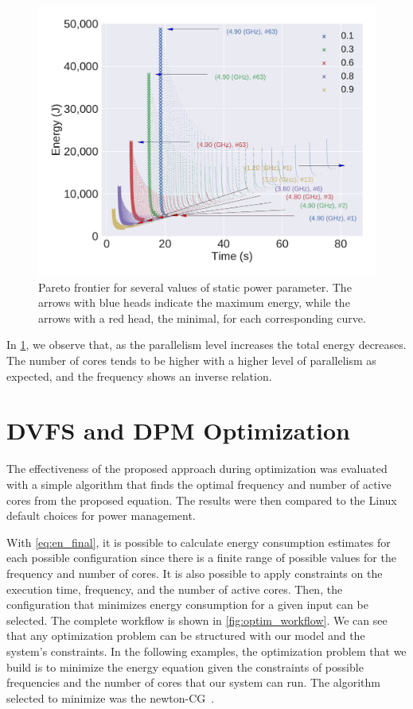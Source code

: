 \begin{figure}[H]
	\includegraphics[width=\columnwidth]{models/figures/analisys/pareto_w_high.pdf}
	\caption{Pareto frontier for several values of static power parameter. The arrows with blue heads indicate the maximum energy, while the arrows with a red head, the minimal, for each corresponding curve.}%
	\label{fig:pareto_w}
\end{figure}

In  \cref{fig:pareto_w}, we observe that, as the parallelism level increases the total energy decreases. The number of cores tends to be higher with a higher level of parallelism as expected, and the frequency shows an inverse relation.


\section{DVFS and DPM Optimization} \label{sec:dvfs_dpm_optminzation}
The effectiveness of the proposed approach during optimization was evaluated with a simple algorithm that finds the optimal frequency and number of active cores from the proposed equation. The results were then compared to the Linux default choices for power management.

With \cref{eq:en_final}, it is possible to calculate energy consumption estimates for each possible configuration since there is a finite range of possible values for the frequency and number of cores. It is also possible to apply constraints on the execution time, frequency, and the number of active cores. Then, the configuration that minimizes energy consumption for a given input can be selected. The complete workflow is shown in \cref{fig:optim_workflow}. We can see that any optimization problem can be structured with our model and the system's constraints. In the following examples, the optimization problem that we build is to minimize the energy equation given the constraints of possible frequencies and the number of cores that our system can run. The algorithm selected to minimize was the newton-CG~\cite{Royer2020AOptimization}.

